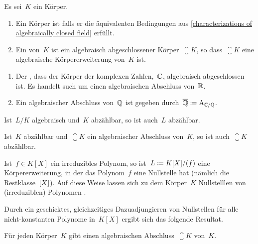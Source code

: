 \begin{definition}
  Es sei~$K$ ein Körper.
  \begin{enumerate}
    \item
      Ein Körper ist  falls er die äquivalenten Bedingungen aus \cref{characterizations of algebraically closed field} erfüllt.
    \item
      Ein  von~$K$ ist ein algebraisch abgeschlossener Körper~$\closure{K}$, so dass~$\closure{K}$ eine algebraische Körpererweiterung von~$K$ ist.
  \end{enumerate}
\end{definition}

\begin{example}
  \leavevmode
  \begin{enumerate}
    \item
      Der , dass der Körper der komplexen Zahlen,~$\mathbb{C}$, algebraisch abgeschlossen ist.
      Es handelt such um einen algebraischen Abschluss von~$\mathbb{R}$.
    \item
      Ein algebraischer Abschluss von~$\mathbb{Q}$ ist gegeben durch~$\overline{\mathbb{Q}} \coloneqq \operatorname{A}_{\mathbb{C}/\mathbb{Q}}$.
  \end{enumerate}
\end{example}

\begin{lemma}
  Ist~$L/K$ algebraisch und~$K$ abzählbar, so ist auch~$L$ abzählbar.
\end{lemma}

\begin{corollary}
  Ist~$K$ abzählbar und~$\closure{K}$ ein algebraischer Abschluss von~$K$, so ist auch~$\closure{K}$ abzählbar.
\end{corollary}

Ist~$f \in K[X]$ ein irreduzibles Polynom, so ist~$L \coloneqq K[X]/(f)$ eine Körpererweiterung, in der das Polynom~$f$ eine Nullstelle hat (nämlich die Restklasse~$[X]$).
Auf diese Weise lassen sich zu dem Körper~$K$ Nullstelllen von (irreduziblen) Polynomen .

Durch ein geschicktes, gleichzeitiges Dazuadjungieren von Nullstellen für alle nicht-\hspace{0pt}konstanten Polynome in~$K[X]$ ergibt sich das folgende Resultat.

\begin{theorem}[Steinitz]
  Für jeden Körper~$K$ gibt einen algebraischen Abschluss~$\closure{K}$ von~$K$.
\end{theorem}





